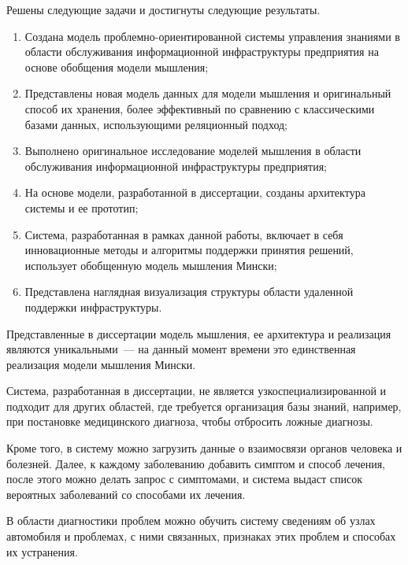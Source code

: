 
Решены следующие задачи и достигнуты следующие результаты.
\begin{enumerate}
  \item Создана модель проблемно-ориентированной системы управления знаниями в области обслуживания информационной инфраструктуры предприятия на основе обобщения модели мышления;
  \item Представлены новая модель данных для модели мышления и оригинальный способ их хранения, более эффективный по сравнению с классическими базами данных, использующими реляционный подход;
  \item Выполнено оригинальное исследование моделей мышления в области обслуживания информационной инфраструктуры предприятия;
  \item На основе модели, разработанной в диссертации, созданы архитектура системы и ее прототип; 
  \item Система, разработанная в рамках данной работы, включает в себя инновационные методы и алгоритмы поддержки принятия решений, использует обобщенную модель мышления Мински;
  \item Представлена наглядная визуализация структуры области удаленной поддержки инфраструктуры.
\end{enumerate}

Представленные в диссертации модель мышления, ее архитектура и реализация являются уникальными~--- на данный момент времени это единственная реализация модели мышления Мински. \par
Система, разработанная в диссертации, не является узкоспециализированной и подходит для других областей, где требуется организация базы знаний, например, при постановке медицинского диагноза, чтобы отбросить ложные диагнозы. \par
Кроме того, в систему можно загрузить данные о взаимосвязи органов человека и болезней. Далее, к каждому заболеванию добавить симптом и способ лечения, после этого можно делать запрос с симптомами, и система выдаст список вероятных заболеваний со способами их лечения. \par
В области диагностики проблем можно обучить систему сведениям об узлах автомобиля и проблемах, с ними связанных, признаках этих проблем и способах их устранения. 



